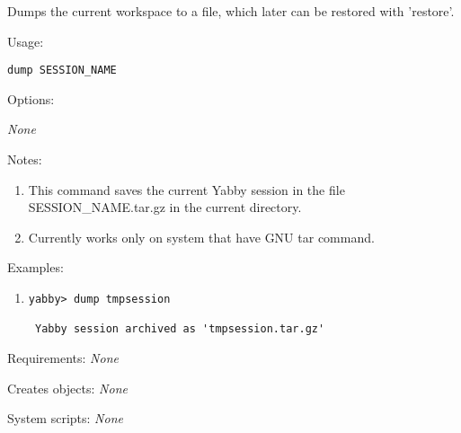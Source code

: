 
Dumps the current workspace to a file, which later can be restored
with 'restore'.


\begin{description}


\item{Usage:}

{\tt dump SESSION\_NAME}


\item{Options:}
\begin{description}
{\em None}
\end{description}


\item{Notes:}
\begin{enumerate}
\item This command saves the current Yabby session in the file
 SESSION\_NAME.tar.gz in the current directory.
\item Currently works only on system that have GNU tar command.
\end{enumerate}


\item{Examples:}
\begin{enumerate}

\item
\begin{verbatim}
yabby> dump tmpsession

 Yabby session archived as 'tmpsession.tar.gz'
\end{verbatim}

\end{enumerate}


\item{Requirements:} {\em None}


\item{Creates objects:} {\em None}


\item{System scripts:} {\em None}

\end{description}



